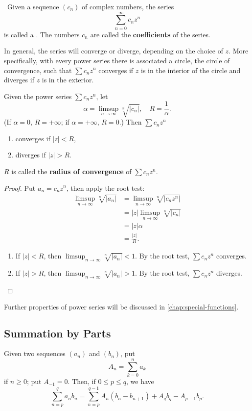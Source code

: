 \begin{example} \
Given a sequence $(c_n)$ of complex numbers, the series
\[\sum_{n=0}^{\infty}c_nz^n\]
is called a . The numbers $c_n$ are called the \textbf{coefficients} of the series.

In general, the series will converge or diverge, depending on the choice of $z$. More specifically, with every power series there is associated a circle, the circle of convergence, such that $\sum c_nz^n$ converges if $z$ is in the interior of the circle and diverges if $z$ is in the exterior.

\begin{proposition*}
Given the power series $\sum c_nz^n$, let
\[\alpha=\limsup_{n\to\infty}\sqrt[n]{|c_n|},\quad R=\frac{1}{\alpha}.\]
(If $\alpha=0$, $R=+\infty$; if $\alpha=+\infty$, $R=0$.) Then $\sum c_nz^n$
\begin{enumerate}[label=(\roman*)]
\item converges if $|z|<R$,
\item diverges if $|z|>R$.
\end{enumerate}
\end{proposition*}

$R$ is called the \textbf{radius of convergence} of $\sum c_nz^n$.

\begin{proof}
Put $a_n=c_nz^n$, then apply the root test:
\begin{align*}
\limsup_{n\to\infty}\sqrt[n]{|a_n|}
&=\limsup_{n\to\infty}\sqrt[n]{|c_nz^n|}\\
&=|z|\limsup_{n\to\infty}\sqrt[n]{|c_n|}\\
&=|z|\alpha\\
&=\frac{|z|}{R}.
\end{align*}
\begin{enumerate}[label=(\roman*)]
\item If $|z|<R$, then $\displaystyle\limsup_{n\to\infty}\sqrt[n]{|a_n|}<1$. By the root test, $\sum c_nz^n$ converges.
\item If $|z|>R$, then $\displaystyle\limsup_{n\to\infty}\sqrt[n]{|a_n|}>1$. By the root test, $\sum c_nz^n$ diverges.
\end{enumerate}
\end{proof}

Further properties of power series will be discussed in \cref{chap:special-functions}.
\end{example}

\subsection{Summation by Parts}
\begin{proposition}
Given two sequences $(a_n)$ and $(b_n)$, put
\[A_n=\sum_{k=0}^{n}a_k\]
if $n\ge0$; put $A_{-1}=0$. Then, if $0\le p\le q$, we have
\[\sum_{n=p}^{q}a_nb_n=\sum_{n=p}^{q-1}A_n(b_n-b_{n+1})+A_qb_q-A_{p-1}b_p.\]
\end{proposition}

